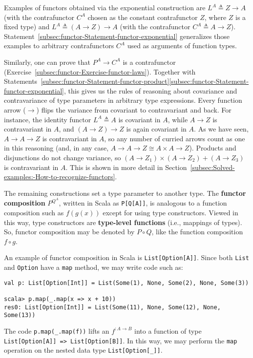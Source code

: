 Examples of functors obtained via the exponential
construction are $L^{A}\triangleq Z\rightarrow A$ (with the contrafunctor
$C^{A}$ chosen as the constant contrafunctor $Z$, where $Z$ is
a fixed type) and $L^{A}\triangleq\left(A\rightarrow Z\right)\rightarrow A$
(with the contrafunctor $C^{A}\triangleq A\rightarrow Z$). Statement~\ref{subsec:functor-Statement-functor-exponential}
generalizes those examples to arbitrary contrafunctors $C^{A}$ used
as arguments of function types.

Similarly, one can prove that $P^{A}\rightarrow C^{A}$ is a contrafunctor
(Exercise~\ref{subsec:functor-Exercise-functor-laws}). Together
with Statements~\ref{subsec:functor-Statement-functor-product}\textendash \ref{subsec:functor-Statement-functor-exponential},
this gives us the rules of reasoning about covariance and contravariance
of type parameters in arbitrary type expressions. Every function arrow
($\rightarrow$) flips the variance from covariant to contravariant
and back. For instance, the identity functor $L^{A}\triangleq A$
is covariant in $A$, while $A\rightarrow Z$ is contravariant in
$A$, and $\left(A\rightarrow Z\right)\rightarrow Z$ is again covariant
in $A$. As we have seen, $A\rightarrow A\rightarrow Z$ is contravariant
in $A$, so any number of curried arrows count as one in this reasoning
(and, in any case, $A\rightarrow A\rightarrow Z\cong A\times A\rightarrow Z$).
Products and disjunctions do not change variance, so $\left(A\rightarrow Z_{1}\right)\times\left(A\rightarrow Z_{2}\right)+\left(A\rightarrow Z_{3}\right)$
is contravariant in $A$. This is shown in more detail in Section~\ref{subsec:Solved-examples:-How-to-recognize-functors}.

The remaining constructions set a type parameter to another type.
The \textbf{functor composition} $P^{Q^{A}}$,
written in Scala as \lstinline!P[Q[A]]!, is analogous to a function
composition such as $f(g(x))$ except for using type constructors.
Viewed in this way, type constructors are \textbf{type-level functions}
(i.e., mappings of types). So, functor composition may be denoted
by $P\circ Q$, like the function composition $f\circ g$.

An example of functor composition in Scala is \lstinline!List[Option[A]]!.
Since both \lstinline!List! and \lstinline!Option! have a \lstinline!map!
method, we may write code such as:
\begin{lstlisting}
val p: List[Option[Int]] = List(Some(1), None, Some(2), None, Some(3))

scala> p.map(_.map(x => x + 10))
res0: List[Option[Int]] = List(Some(11), None, Some(12), None, Some(13)) 
\end{lstlisting}
The code \lstinline!p.map(_.map(f))! lifts an $f^{:A\rightarrow B}$
into a function of type \lstinline!List[Option[A]] => List[Option[B]]!.
In this way, we may perform the \lstinline!map! operation on the
nested data type \lstinline!List[Option[_]]!. 

